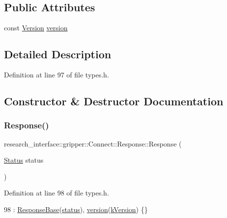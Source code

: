\subsection*{Public Attributes}
\begin{DoxyCompactItemize}
\item 
const \hyperlink{namespaceresearch__interface_1_1gripper_a76ede520b2fa3582ac95cd919eceef5b}{Version} \hyperlink{structresearch__interface_1_1gripper_1_1Connect_1_1Response_a355fda854036780345497c2229f30135}{version}
\end{DoxyCompactItemize}


\subsection{Detailed Description}


Definition at line 97 of file types.\+h.



\subsection{Constructor \& Destructor Documentation}
\mbox{\label{structresearch__interface_1_1gripper_1_1Connect_1_1Response_ab0f3c7eda063443f8e25f8e466229858}} 
\subsubsection{\texorpdfstring{Response()}{Response()}}
{\footnotesize\ttfamily research\+\_\+interface\+::gripper\+::\+Connect\+::\+Response\+::\+Response (\begin{DoxyParamCaption}\item[{\hyperlink{structresearch__interface_1_1gripper_1_1Connect_a814cff5ea860c080fe3f1f127a6d20e2}{Status}}]{status }\end{DoxyParamCaption})\hspace{0.3cm}{\ttfamily [inline]}}



Definition at line 98 of file types.\+h.


\begin{DoxyCode}
98 : \hyperlink{structresearch__interface_1_1gripper_1_1ResponseBase_a22a7f3cb6744d19e3ce8fe36536cdfc4}{ResponseBase}(\hyperlink{structresearch__interface_1_1gripper_1_1ResponseBase_a4d4d13a790eac0381966f39dbcdff84a}{status}), \hyperlink{structresearch__interface_1_1gripper_1_1Connect_1_1Response_a355fda854036780345497c2229f30135}{version}(\hyperlink{namespaceresearch__interface_1_1gripper_a9f7080493bb2d8257d1d88e302739c46}{kVersion}) \{\}
\end{DoxyCode}


